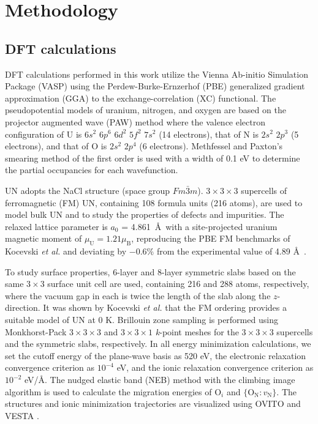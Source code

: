\documentclass[preprint,12pt,sort&compress]{elsarticle}
\newcommand{\?}{\stackrel{?}{=}}
\begin{document}
\section{Methodology}

\subsection{DFT calculations}

DFT calculations performed in this work utilize the Vienna Ab-initio Simulation Package (VASP) \cite{Kresse1993, Kresse1996a, Kresse1996b} using the Perdew-Burke-Ernzerhof (PBE) \cite{Perdew1996} generalized gradient approximation (GGA) to the exchange-correlation (XC) functional. The pseudopotential models of uranium, nitrogen, and oxygen are based on the projector augmented wave (PAW) method \cite{Kresse1999} where the valence electron configuration of U is $6s^2$ $6p^6$ $6d^2$ $5f^2$ $7s^2$ (14 electrons), that of N is $2s^2$ $2p^3$ (5 electrons), and that of O is $2s^2$ $2p^4$ (6 electrons). Methfessel and Paxton’s smearing method \cite{Methfessel1989} of the first order is used with a width of 0.1 eV to determine the partial occupancies for each wavefunction.

UN adopts the NaCl structure (space group $Fm\bar{3}m$). $3 \times 3 \times 3$ supercells of ferromagnetic (FM) UN, containing 108 formula units (216 atoms), are used to model bulk UN and to study the properties of defects and impurities. The relaxed lattice parameter is $a_0$ = 4.861~\AA\ with a site-projected uranium magnetic moment of $\mu_\text{U} = 1.21 \mu_\text{B}$, reproducing the PBE FM benchmarks of Kocevski \textit{et al.} \cite{Kocevski2022I} and deviating by $-0.6$\% from the experimental value of 4.89 \AA\ \cite{Hayes1990I}.

To study surface properties, 6-layer and 8-layer symmetric slabs based on the same $3 \times 3$ surface unit cell are used, containing 216 and 288 atoms, respectively, where the vacuum gap in each is twice the length of the slab along the $z$-direction. It was shown by Kocevski \textit{et al.}
\cite{Kocevski2022I} that the FM ordering provides a suitable model of UN at 0 K. Brillouin zone sampling is performed using Monkhorst-Pack \cite{Monkhorst1976} $3 \times 3 \times 3$ and $3 \times 3 \times 1$ \textit{k}-point meshes for the $3 \times 3 \times 3$ supercells and the symmetric slabs, respectively. In all energy minimization calculations, we set the cutoff energy of the plane-wave basis as 520 eV, the electronic relaxation convergence criterion as $10^{-4}$ eV, and the ionic relaxation convergence criterion as $10^{-2}$ eV/\AA. The nudged elastic band (NEB) method \cite{Henkelman2000a} with the climbing image algorithm \cite{Henkelman2000b} is used to calculate the migration energies of O$_i$ and $\{\text{O}_\text{N} \! : \! v_\text{N}\}$. The structures and ionic minimization trajectories are visualized using OVITO \cite{Stukowski2010} and VESTA \cite{Momma2008}.
\end{document}
